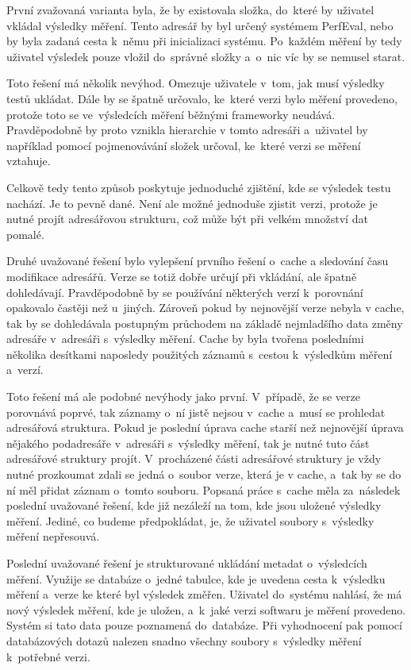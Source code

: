 První zvažovaná varianta byla, že by existovala složka, do~které by uživatel vkládal výsledky měření. Tento adresář by byl určený
systémem PerfEval, nebo by byla zadaná cesta k~němu při inicializaci systému. Po~každém měření by tedy uživatel výsledek pouze
vložil do~správné složky a~o~nic víc by se nemusel starat.

Toto řešení má několik nevýhod. Omezuje uživatele v~tom, jak musí výsledky testů ukládat. Dále by se špatně určovalo,
ke~které verzi bylo měření provedeno, protože toto se ve~výsledcích měření běžnými frameworky neudává. Pravděpodobně by proto
vznikla hierarchie v tomto adresáři a~uživatel by například pomocí pojmenovávání složek určoval, ke~které verzi se měření vztahuje.

Celkově tedy tento způsob poskytuje jednoduché zjištění, kde se výsledek testu nachází. Je to pevně dané. Není ale možné jednoduše
zjistit verzi, protože je nutné projít adresářovou strukturu, což může být při velkém množství dat pomalé.

Druhé uvažované řešení bylo vylepšení prvního řešení o~cache a sledování času modifikace adresářů. Verze se totiž dobře určují při vkládání,
ale špatně dohledávají. Pravděpodobně by se používání některých verzí k~porovnání opakovalo častěji než u~jiných.
Zároveň pokud by nejnovější verze nebyla v cache, tak by se dohledávala postupným průchodem na základě nejmladšího data změny adresáře
v~adresáři s~výsledky měření. Cache by byla tvořena posledními několika desítkami naposledy použitých záznamů s~cestou k~výsledkům měření a~verzí.

Toto řešení má ale podobné nevýhody jako první. V~případě, že se verze porovnává poprvé, tak záznamy o~ní jistě nejsou v~cache
a~musí se prohledat adresářová struktura. Pokud je poslední úprava cache starší než nejnovější úprava nějakého podadresáře v~adresáři
s~výsledky měření, tak je nutné tuto část adresářové struktury projít. V~procházené části adresářové struktury je vždy nutné prozkoumat
zdali se jedná o~soubor verze, která je v cache, a~tak by se do ní měl přidat záznam o~tomto souboru. Popsaná práce s~cache měla
za~následek poslední uvažované řešení, kde již nezáleží na tom, kde jsou uložené výsledky měření. Jediné, co budeme předpokládat, je,
že uživatel soubory s~výsledky měření nepřesouvá.

Poslední uvažované řešení je strukturované ukládání metadat o~výsledcích měření. Využije se databáze o~jedné tabulce, kde
je uvedena cesta k~výsledku měření a~verze ke které byl výsledek změřen. Uživatel do~systému nahlásí, že má nový výsledek
měření, kde je uložen, a~k~jaké verzi softwaru je měření provedeno. Systém si tato data pouze poznamená do~databáze. Při
vyhodnocení pak pomocí databázových dotazů nalezen snadno všechny soubory s~výsledky měření k~potřebné verzi.

